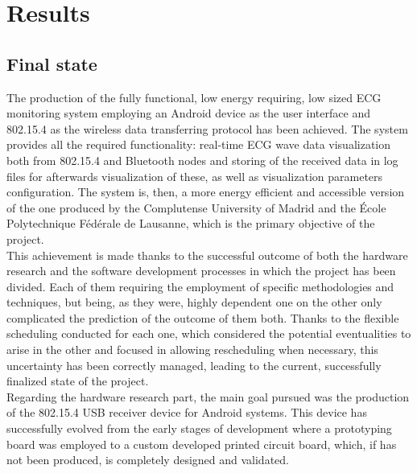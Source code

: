 \chapter{Results}
\label{cha:results}

	\section{Final state}
	\label{sec:end-state}
	


		The production of the fully functional, low energy requiring, low sized ECG monitoring system employing an Android device as the user interface and 802.15.4 as the wireless data transferring protocol has been achieved. The system provides all the required functionality: real-time ECG wave data visualization both from 802.15.4 and Bluetooth nodes and storing of the received data in log files for afterwards visualization of these, as well as visualization parameters configuration. The system is, then, a more energy efficient and accessible version of the one produced by the Complutense University of Madrid and the École Polytechnique Fédérale de Lausanne, which is the primary objective of the project.\\

		This achievement is made thanks to the successful outcome of both the hardware research and the software development processes in which the project has been divided. Each of them requiring the employment of specific methodologies and techniques, but being, as they were, highly dependent one on the other only complicated the prediction of the outcome of them both. Thanks to the flexible scheduling conducted for each one, which considered the potential eventualities to arise in the other and focused in allowing rescheduling when necessary, this uncertainty has been correctly managed, leading to the current, successfully finalized state of the project.\\
		
		Regarding the hardware research part, the main goal pursued was the production of the 802.15.4 USB receiver device for Android systems. This device has successfully evolved from the early stages of development where a prototyping board was employed to a custom developed printed circuit board, which, if has not been produced, is completely designed and validated.\\

